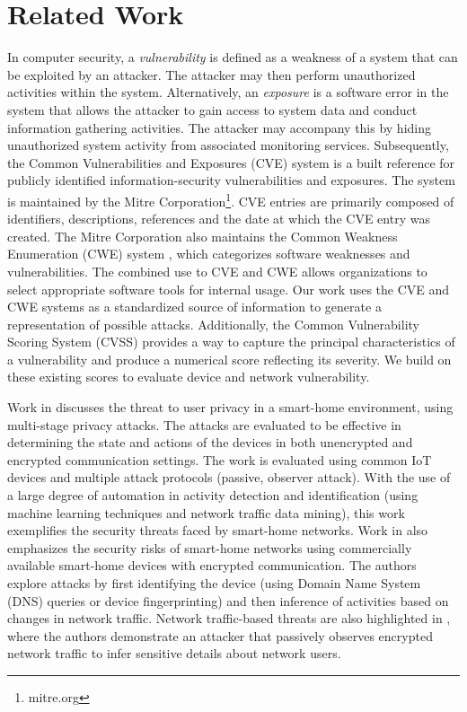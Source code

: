 \section{Related Work}
\label{sec:related_work}

In computer security, a \textit{vulnerability} is defined as a weakness of a system that can be exploited by an attacker. The attacker may then perform unauthorized activities within the system. Alternatively, an \textit{exposure} is a software error in the system that allows the attacker to gain access to system data and conduct information gathering activities. The attacker may accompany this by hiding unauthorized system activity from associated monitoring services. Subsequently, the Common Vulnerabilities and Exposures (CVE) system \cite{mell2006common} is a built reference for publicly identified information-security vulnerabilities and exposures. The system is maintained by the Mitre Corporation\footnote{mitre.org}. CVE entries are primarily composed of identifiers, descriptions, references and the date at which the CVE entry was created. The Mitre Corporation also maintains the Common Weakness Enumeration (CWE) system \cite{martin2007common}, which categorizes software weaknesses and vulnerabilities. The combined use to CVE and CWE allows organizations to select appropriate software tools for internal usage. Our work uses the CVE and CWE systems as a standardized source of information to generate a representation of possible attacks. Additionally, the Common Vulnerability Scoring System (CVSS) \cite{mell2006common} provides a way to capture the principal characteristics of a vulnerability and produce a numerical score reflecting its severity. We build on these existing scores to evaluate device and network vulnerability.

Work in \cite{acar2018peek} discusses the threat to user privacy in a smart-home environment, using multi-stage privacy attacks. The attacks are evaluated to be effective in determining the state and actions of the devices in both unencrypted and encrypted communication settings. The work is evaluated using common IoT devices and multiple attack protocols (passive, observer attack). With the use of a large degree of automation in activity detection and identification (using machine learning techniques and network traffic data mining), this work exemplifies the security threats faced by smart-home networks. Work in \cite{apthorpe2017spying} also emphasizes the security risks of smart-home networks using commercially available smart-home devices with encrypted communication. The authors explore attacks by first identifying the device (using Domain Name System (DNS) queries or device fingerprinting) and then inference of activities based on changes in network traffic. Network traffic-based threats are also highlighted in \cite{apthorpe2017smart}, where the authors demonstrate an attacker that passively observes encrypted network traffic to infer sensitive details about network users.

